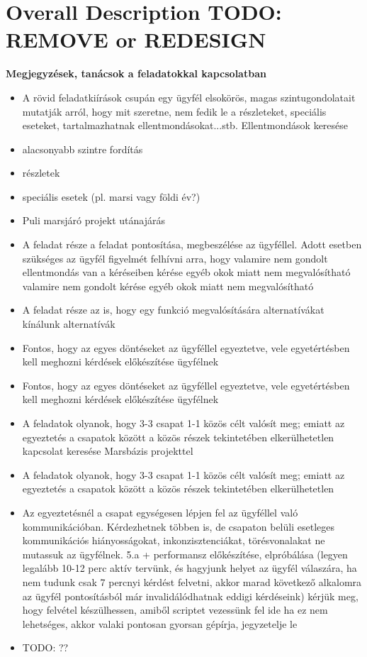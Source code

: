 \documentclass[12pt]{report}
\begin{document}
\chapter{Overall Description TODO: REMOVE or REDESIGN}

\textbf{Megjegyzések, tanácsok a feladatokkal kapcsolatban} 
\begin{itemize}
    \item A rövid feladatkiírások csupán egy ügyfél elsokörös, magas szintugondolatait mutatják arról, hogy mit szeretne, nem fedik le a részleteket, speciális eseteket, tartalmazhatnak ellentmondásokat...stb.
    Ellentmondások keresése
    \item alacsonyabb szintre fordítás
    \item részletek
    \item speciális esetek (pl. marsi vagy földi év?)
    \item Puli marsjáró projekt utánajárás
    \item A feladat része a feladat pontosítása, megbeszélése az ügyféllel. Adott esetben szükséges az ügyfél figyelmét felhívni arra, hogy valamire nem gondolt  ellentmondás van a kéréseiben  kérése egyéb okok miatt nem megvalósítható    
    valamire nem gondolt kérése egyéb okok miatt nem megvalósítható
    \item A feladat része az is, hogy egy funkció megvalósítására alternatívákat kínálunk    
    alternatívák
    \item Fontos, hogy az egyes döntéseket az ügyféllel egyeztetve, vele egyetértésben kell meghozni
    kérdések előkészítése ügyfélnek
    \item Fontos, hogy az egyes döntéseket az ügyféllel egyeztetve, vele egyetértésben kell meghozni
    kérdések előkészítése ügyfélnek
    \item A feladatok olyanok, hogy 3-3 csapat 1-1 közös célt valósít meg; emiatt az egyeztetés a csapatok között a közös részek tekintetében elkerülhetetlen
    kapcsolat keresése Marsbázis projekttel
    \item A feladatok olyanok, hogy 3-3 csapat 1-1 közös célt valósít meg; emiatt az egyeztetés a csapatok között a közös részek tekintetében elkerülhetetlen
    \item Az egyeztetésnél a csapat egységesen lépjen fel az ügyféllel való kommunikációban. Kérdezhetnek többen is, de csapaton belüli esetleges kommunikációs hiányosságokat, inkonzisztenciákat, törésvonalakat ne mutassuk az ügyfélnek.
    5.a + performansz előkészítése, elpróbálása (legyen legalább 10-12 perc aktív tervünk, és hagyjunk helyet az ügyfél válaszára, ha nem tudunk csak 7 percnyi kérdést felvetni, akkor marad következő alkalomra  az ügyfél pontosításból már invalidálódhatnak eddigi kérdéseink)
    kérjük meg, hogy felvétel készülhessen, amiből scriptet vezessünk fel ide
    ha ez nem lehetséges, akkor valaki pontosan gyorsan gépírja, jegyzetelje le
    \item TODO: ??

\end{itemize}                  
\end{document}

